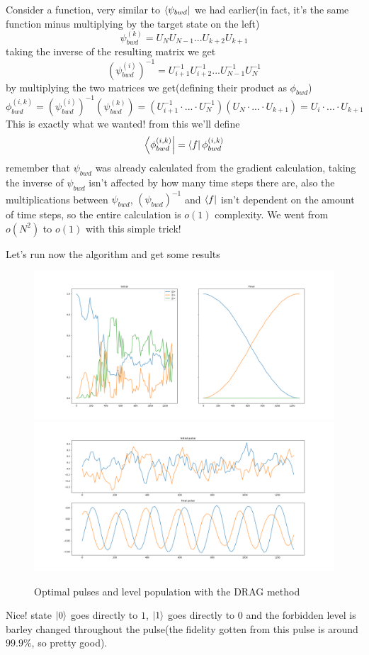\documentclass[english, a4paper, 12pt, twoside]{article}
\numberwithin{equation}{section} %
\begin{document}
Consider a function, very similar to  $\bra{\psi_{bwd}}$ we had earlier(in fact, it's the same function minus multiplying by the target state on the left)
\[
    \psi_{bwd}^{(k)} = U_NU_{N-1}...U_{k+2}U_{k+1}
\]
taking the inverse of the resulting matrix we get
\[
    (\psi_{bwd}^{(i)})^{-1} = U_{i+1}^{-1}U_{i+2}^{-1}...U_{N-1}^{-1}U_{N}^{-1}
\]
by multiplying the two matrices we get(defining their product as $\phi_{bwd}$)
\[
    \phi_{bwd}^{(i,k)} = (\psi_{bwd}^{(i)})^{-1}(\psi_{bwd}^{(k)}) = (U_{i+1}^{-1}\cdot...\cdot U_{N}^{-1})(U_N\cdot...\cdot U_{k+1}) = U_{i}\cdot...\cdot U_{k+1}
\]
This is exactly what we wanted! from this we'll define
\[
    \bra{\phi_{bwd}^{(i,k)}} = \bra{f}\phi_{bwd}^{(i,k)}
\]
remember that $\psi_{bwd}$ was already calculated from the gradient calculation, taking the inverse of $\psi_{bwd}$ isn't affected by how many time steps there are, also the multiplications between $\psi_{bwd}$, $(\psi_{bwd})^{-1}$ and $\bra{f}$ isn't dependent on the amount of time steps, so the entire calculation is $o(1)$ complexity. We went from $o(N^2)$ to $o(1)$ with this simple trick!

Let's run now the algorithm and get some results
\begin{figure}[H]
    \centering
    \includegraphics[width=1\columnwidth]{Results/DRAG/Population-Low-Quality.png}
    \includegraphics[width=1\columnwidth]{Results/DRAG/pulses-Low-Quality.png}
    \caption{Optimal pulses and level population with the DRAG method}
    \label{fig:sDRAG-results}
\end{figure}
Nice! state $\ket{0}$ goes directly to $1$, $\ket{1}$ goes directly to $0$ and the forbidden level is barley changed throughout the pulse(the fidelity gotten from this pulse is around $99.9\%$, so pretty good).
\end{document}
